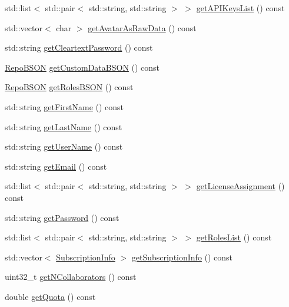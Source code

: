 \begin{DoxyCompactItemize}
\item 
std\+::list$<$ std\+::pair$<$ std\+::string, std\+::string $>$ $>$ \hyperlink{classrepo_1_1core_1_1model_1_1_repo_user_a0b7fc82e2b6fbdc20d35716f1fe728ec}{get\+A\+P\+I\+Keys\+List} () const 
\item 
std\+::vector$<$ char $>$ \hyperlink{classrepo_1_1core_1_1model_1_1_repo_user_a3d74ec156cfbe972b29024a44eb40d1d}{get\+Avatar\+As\+Raw\+Data} () const 
\item 
std\+::string \hyperlink{classrepo_1_1core_1_1model_1_1_repo_user_ae9ad66fb853addbd37b73105018b25da}{get\+Cleartext\+Password} () const 
\item 
\hyperlink{classrepo_1_1core_1_1model_1_1_repo_b_s_o_n}{Repo\+B\+S\+O\+N} \hyperlink{classrepo_1_1core_1_1model_1_1_repo_user_ab1042e8a4bb197795dcd42ecca44e770}{get\+Custom\+Data\+B\+S\+O\+N} () const 
\item 
\hyperlink{classrepo_1_1core_1_1model_1_1_repo_b_s_o_n}{Repo\+B\+S\+O\+N} \hyperlink{classrepo_1_1core_1_1model_1_1_repo_user_adf71588560ad5d318f12db604ce1762a}{get\+Roles\+B\+S\+O\+N} () const 
\item 
std\+::string \hyperlink{classrepo_1_1core_1_1model_1_1_repo_user_a3f010f00fdf8880e88d786a697832840}{get\+First\+Name} () const 
\item 
std\+::string \hyperlink{classrepo_1_1core_1_1model_1_1_repo_user_ab6fca4716968d3bff91c517092b471a8}{get\+Last\+Name} () const 
\item 
std\+::string \hyperlink{classrepo_1_1core_1_1model_1_1_repo_user_a60eff8abee2614b2ff3bad137fad2634}{get\+User\+Name} () const 
\item 
std\+::string \hyperlink{classrepo_1_1core_1_1model_1_1_repo_user_ad4ebb8b43b1b54f8460d2c074fac0d92}{get\+Email} () const 
\item 
std\+::list$<$ std\+::pair$<$ std\+::string, std\+::string $>$ $>$ \hyperlink{classrepo_1_1core_1_1model_1_1_repo_user_ae87706868f82a0e4b1e630e7b0af158d}{get\+License\+Assignment} () const 
\item 
std\+::string \hyperlink{classrepo_1_1core_1_1model_1_1_repo_user_a429fcd98aec55a529c6e5d6a7f56104d}{get\+Password} () const 
\item 
std\+::list$<$ std\+::pair$<$ std\+::string, std\+::string $>$ $>$ \hyperlink{classrepo_1_1core_1_1model_1_1_repo_user_a3ce3188cb264f053f7508f68210b301c}{get\+Roles\+List} () const 
\item 
std\+::vector$<$ \hyperlink{structrepo_1_1core_1_1model_1_1_repo_user_1_1_subscription_info}{Subscription\+Info} $>$ \hyperlink{classrepo_1_1core_1_1model_1_1_repo_user_a252c008f819e4992ae277e99035167a7}{get\+Subscription\+Info} () const 
\item 
uint32\+\_\+t \hyperlink{classrepo_1_1core_1_1model_1_1_repo_user_a6a1396bb826507640c817a87db045608}{get\+N\+Collaborators} () const 
\item 
double \hyperlink{classrepo_1_1core_1_1model_1_1_repo_user_ab2eca743fef5572c5eec150c5e60262f}{get\+Quota} () const 
\end{DoxyCompactItemize}
